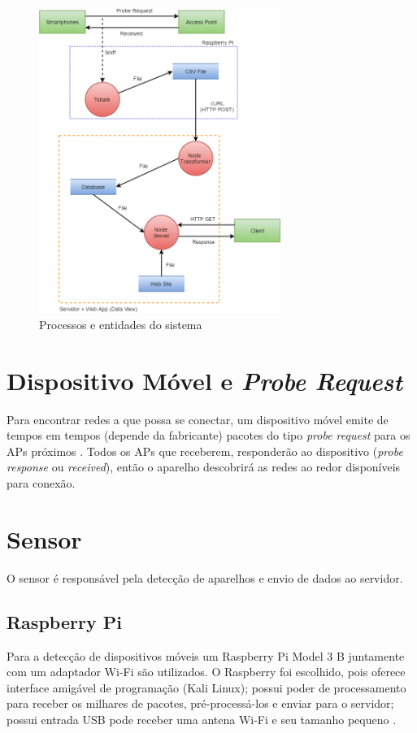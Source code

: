 \begin{figure}[!h]
  \caption{\label{diagrama-fluxo}Processos e entidades do sistema}
  \begin{center}
    \includegraphics[width=0.70\textwidth]{img/diagrama_fluxo.png}
  \end{center}
\end{figure}

\section{Dispositivo Móvel e \emph{Probe Request}}
\label{smartphone-probe}
Para encontrar redes a que possa se conectar, um dispositivo móvel emite de tempos em tempos (depende da fabricante) pacotes do tipo \emph{probe request} para os APs próximos \cite{Meraki}. Todos os APs que receberem, responderão ao dispositivo (\emph{probe response} ou \emph{received}), então o aparelho descobrirá as redes ao redor disponíveis para conexão.

\section{Sensor}
O sensor é responsável pela detecção de aparelhos e envio de dados ao servidor.

\subsection{Raspberry Pi}
Para a detecção de dispositivos móveis um Raspberry Pi Model 3 B juntamente com um adaptador Wi-Fi são utilizados. O Raspberry foi escolhido,
pois oferece interface amigável de programação (Kali Linux); possui poder de processamento para receber os milhares de pacotes, pré-processá-los
e enviar para o servidor; possui entrada USB pode receber uma antena Wi-Fi e seu tamanho pequeno \cite{rpi2017}.

